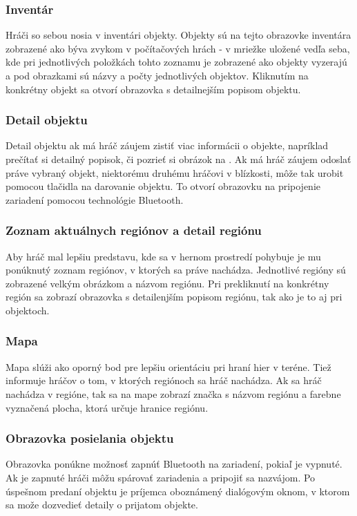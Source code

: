 \subsubsection{Inventár}
Hráči so sebou nosia v inventári objekty. Objekty sú na tejto obrazovke inventára zobrazené ako býva zvykom v počítačových hrách - v mriežke uložené vedľa seba, kde pri jednotlivých položkách tohto zoznamu je zobrazené ako objekty vyzerajú a pod obrazkami sú názvy a počty jednotlivých objektov. Kliknutím na konkrétny objekt sa otvorí obrazovka s detailnejším popisom objektu.

\subsubsection{Detail objektu}
Detail objektu  ak má hráč záujem zistiť viac informácii o objekte, napríklad prečítať si detailný popisok, či pozrieť si obrázok na . Ak má hráč záujem odoslať práve vybraný objekt, niektorému druhému hráčovi v blízkosti, môže tak urobit pomocou tlačidla na darovanie objektu. To otvorí obrazovku na pripojenie zariadení pomocou technológie Bluetooth.

\subsubsection{Zoznam aktuálnych regiónov a detail regiónu}
Aby hráč mal lepšiu predstavu, kde sa v hernom prostredí pohybuje je mu ponúknutý zoznam regiónov, v ktorých sa práve nachádza. Jednotlivé regióny sú zobrazené velkým obrázkom a názvom regiónu. Pri prekliknutí na konkrétny región sa zobrazí obrazovka s detailenjším popisom regiónu, tak ako je to aj pri objektoch.

\subsubsection{Mapa}
Mapa slúži ako oporný bod  pre lepšiu orientáciu pri hraní hier v teréne. Tiež informuje hráčov o tom, v ktorých regiónoch sa hráč nachádza. Ak sa hráč nachádza v regióne, tak sa na mape zobrazí značka s názvom regiónu a farebne vyznačená plocha, ktorá určuje hranice regiónu.

\subsubsection{Obrazovka posielania objektu}
Obrazovka ponúkne možnosť zapnúť Bluetooth na zariadení, pokiaľ je vypnuté. Ak je zapnuté hráči môžu spárovať zariadenia a pripojiť sa nazvájom. Po úspešnom predaní objektu je príjemca oboznámený dialógovým oknom, v ktorom sa može dozvedieť detaily o prijatom objekte.


